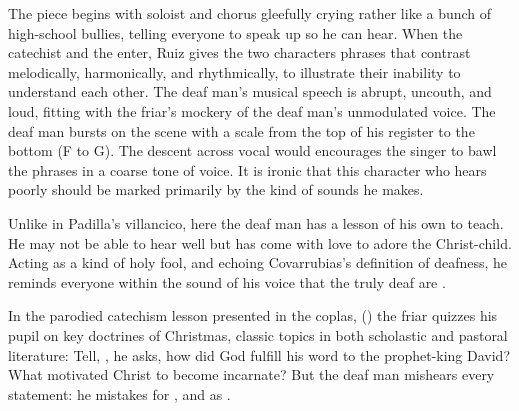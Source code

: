 
The piece begins with soloist and chorus gleefully crying   rather like a bunch of high-school bullies, telling everyone to speak up so he can hear.
When the catechist and the  enter, Ruiz gives the two characters phrases that contrast melodically, harmonically, and rhythmically, to illustrate their inability to understand each other.
The deaf man's musical speech is abrupt, uncouth, and loud, fitting with the friar's mockery of the deaf man's unmodulated voice.
The deaf man bursts on the scene with a scale from the top of his register to the bottom (F to G).
The descent across vocal  would encourages the singer to bawl the phrases in a coarse tone of voice.
It is ironic that this character who hears poorly should be marked primarily by the kind of sounds he makes.


Unlike in Padilla's villancico, here the deaf man has a lesson of his own to teach.
He may not be able to hear well but has come with love to adore the Christ-child. 
Acting as a kind of holy fool, and echoing Covarrubias's definition of deafness, he reminds everyone within the sound of his voice that the truly deaf are .

In the parodied catechism lesson presented in the coplas, () the friar quizzes his pupil on key doctrines of Christmas, classic topics in both scholastic and pastoral literature:
Tell, , he asks, how did God fulfill his word to the prophet-king David?
What motivated Christ to become incarnate?%
But the deaf man mishears every statement: he mistakes  for , and  as .

